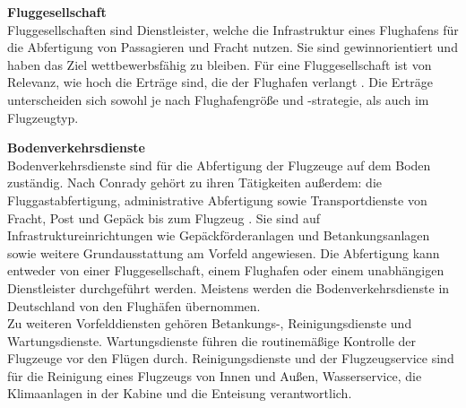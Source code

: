 \textbf{Fluggesellschaft} \\
Fluggesellschaften sind Dienstleister, welche die Infrastruktur eines Flughafens für die 
Abfertigung von Passagieren und Fracht nutzen. 
Sie sind gewinnorientiert und haben das Ziel wettbewerbsfähig zu bleiben. 
Für eine Fluggesellschaft ist von Relevanz, wie hoch die Erträge
sind, die der Flughafen verlangt \cite{schaar2010analysis}. 
Die Erträge unterscheiden sich sowohl je nach Flughafengröße und -strategie, als auch im Flugzeugtyp.

\textbf{Bodenverkehrsdienste}\\ %
%
Bodenverkehrsdienste sind für die Abfertigung der Flugzeuge auf dem Boden zuständig.
Nach Conrady \cite{conrady2019luftverkehr} gehört zu ihren Tätigkeiten außerdem:  
die Fluggastabfertigung, administrative Abfertigung sowie Transportdienste von Fracht, Post und Gepäck bis zum Flugzeug \cite{mensen2013handbuch}.
Sie sind auf Infrastruktureinrichtungen wie Gepäckförderanlagen und Betankungsanlagen 
sowie weitere Grundausstattung am Vorfeld angewiesen. 
Die Abfertigung kann entweder von einer Fluggesellschaft, einem Flughafen oder einem 
unabhängigen Dienstleister durchgeführt werden. 
Meistens werden die Bodenverkehrsdienste in Deutschland von den Flughäfen übernommen.\\ %
%
Zu weiteren Vorfelddiensten gehören Betankungs-, Reinigungsdienste und Wartungsdienste.
Wartungsdienste führen die routinemäßige Kontrolle der Flugzeuge vor den Flügen durch.
Reinigungsdienste und der Flugzeugservice sind für die Reinigung eines Flugzeugs 
von Innen und Außen, Wasserservice, die Klimaanlagen in der Kabine und die Enteisung verantwortlich.
%
%
%
